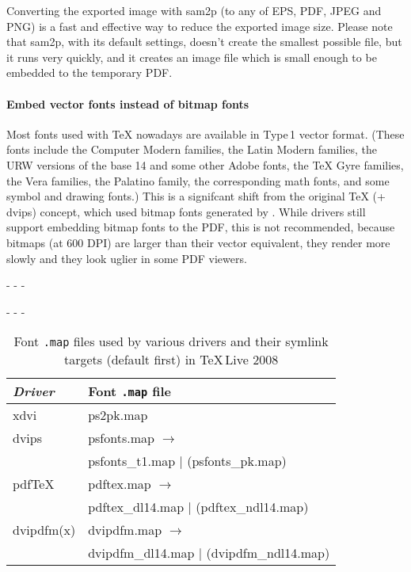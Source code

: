 \documentclass{ltugproc}
\def\cmd{\textsf}
\def\pkg{\textsf}
\def\captiontop#1{%
  \advance\abovecaptionskip-\belowcaptionskip
  \advance\belowcaptionskip\abovecaptionskip
  \advance\abovecaptionskip-\belowcaptionskip
  \abovecaptionskip-\abovecaptionskip
  \caption{#1}%
  \advance\abovecaptionskip-\belowcaptionskip
  \advance\belowcaptionskip\abovecaptionskip
  \advance\abovecaptionskip-\belowcaptionskip
  \abovecaptionskip-\abovecaptionskip
}
\begin{document}
Converting the exported image with \cmd{sam2p} (to any of EPS, PDF, JPEG and
PNG) is a fast and effective way to reduce the exported image size. Please
note that \cmd{sam2p}, with its default settings, doesn't create the
smallest possible file, but it runs very quickly, and it creates an image
file which is small enough to be embedded to the temporary PDF.

\paragraph{Embed vector fonts instead of bitmap fonts}

Most fonts used with \TeX{} nowadays are available in Type\,1 vector format.
(These fonts include the Computer Modern families, the Latin Modern families,
the URW versions of the base 14 and some other Adobe fonts,
the \TeX{} Gyre families, the Vera families, the Palatino family, the
corresponding math fonts, and some symbol and drawing fonts.) This is a
signifcant shift from the original \TeX{} (+ \cmd{dvips}) concept, which used
bitmap fonts generated by \MF{}. While drivers still support embedding
bitmap fonts to the PDF, this is not recommended, because bitmaps (at 600
DPI) are larger than their vector equivalent, they render more slowly and
they look uglier in some PDF viewers.

\begin{table}
\captiontop{Font \texttt{.map} files used by various drivers and their
symlink targets (default first) in \TeX{}\,Live 2008}\label{tab:mapfiles}
\par\small\noindent\hfil
\begin{tabular}{@{}ll@{}}
\toprule
\emph{Driver} & Font \texttt{.map} file\\
\midrule
\cmd{xdvi} & \pkg{ps2pk.map} \\
\cmd{dvips}& \pkg{psfonts.map} $\to$\\
           & \pkg{psfonts\_t1.map} $|$ (\pkg{psfonts\_pk.map}) \\
pdf\TeX{}  & \pkg{pdftex.map} $\to$\\
           & \pkg{pdftex\_dl14.map} $|$ (\pkg{pdftex\_ndl14.map}) \\
\cmd{dvipdfm(x)}& \pkg{dvipdfm.map} $\to$\\
                & \pkg{dvipdfm\_dl14.map} $|$ (\pkg{dvipdfm\_ndl14.map}) \\
\bottomrule
\end{tabular}
\end{table}
\end{document}
